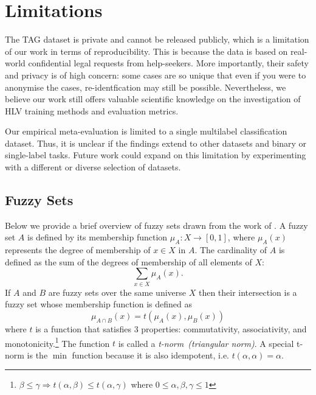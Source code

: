 \documentclass[shortpaper]{clv2025}
\begin{document}
\section*{Limitations}

The TAG dataset is private and cannot be released publicly, which is a
limitation of our work in terms of reproducibility. This is because the data is
based on real-world confidential legal requests from help-seekers. More
importantly, their safety and privacy is of high concern: some cases are so
unique that even if you were to anonymise the cases, re-identfication may still
be possible. Nevertheless, we believe our work still offers valuable scientific
knowledge on the investigation of HLV training methods and evaluation metrics.

Our empirical meta-evaluation is limited to a single multilabel classification
dataset. Thus, it is unclear if the findings extend to other datasets and binary
or single-label tasks. Future work could expand on this limitation by
experimenting with a different or diverse selection of datasets.

\appendix


\subsection{Fuzzy Sets}

Below we provide a brief overview of fuzzy sets drawn from the work of
\citet{kruse2022}. A fuzzy set $A$ is defined by its membership function
$\mu_A:X\to [0,1]$, where $\mu_A(x)$ represents the degree of membership of
$x\in X$ in $A$. The cardinality of $A$ is defined as the sum of the degrees of
membership of all elements of $X$:
\begin{equation*}
  \sum_{x\in X}\mu_A(x).
\end{equation*}
If $A$ and $B$ are fuzzy sets over the same universe $X$ then their intersection
is a fuzzy set whose membership function is defined as
\begin{equation*}
  \mu_{A\cap B}(x)=t(\mu_A(x),\mu_B(x))
\end{equation*}
where $t$ is a function that satisfies 3 properties: commutativity,
associativity, and monotonicity.\footnote{$\beta\leq\gamma\Rightarrow
  t(\alpha,\beta)\leq t(\alpha,\gamma)$ where $0\leq\alpha,\beta,\gamma\leq1$}
The function $t$ is called a \emph{t-norm~(triangular norm)}. A special t-norm
is the $\min$ function because it is also idempotent, i.e.
$t(\alpha,\alpha)=\alpha$.
\end{document}
